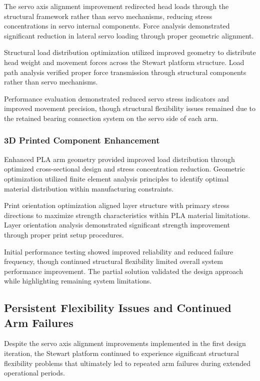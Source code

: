 The servo axis alignment improvement redirected head loads through the structural framework rather than servo mechanisms, reducing stress concentrations in servo internal components. Force analysis demonstrated significant reduction in lateral servo loading through proper geometric alignment.

Structural load distribution optimization utilized improved geometry to distribute head weight and movement forces across the Stewart platform structure. Load path analysis verified proper force transmission through structural components rather than servo mechanisms.

Performance evaluation demonstrated reduced servo stress indicators and improved movement precision, though structural flexibility issues remained due to the retained bearing connection system on the servo side of each arm.

\subsubsection{ 3D Printed Component Enhancement}

Enhanced PLA arm geometry provided improved load distribution through optimized cross-sectional design and stress concentration reduction. Geometric optimization utilized finite element analysis principles to identify optimal material distribution within manufacturing constraints.

Print orientation optimization aligned layer structure with primary stress directions to maximize strength characteristics within PLA material limitations. Layer orientation analysis demonstrated significant strength improvement through proper print setup procedures.

Initial performance testing showed improved reliability and reduced failure frequency, though continued structural flexibility limited overall system performance improvement. The partial solution validated the design approach while highlighting remaining system limitations.

\subsection{Persistent Flexibility Issues and Continued Arm Failures}

Despite the servo axis alignment improvements implemented in the first design iteration, the Stewart platform continued to experience significant structural flexibility problems that ultimately led to repeated arm failures during extended operational periods.

